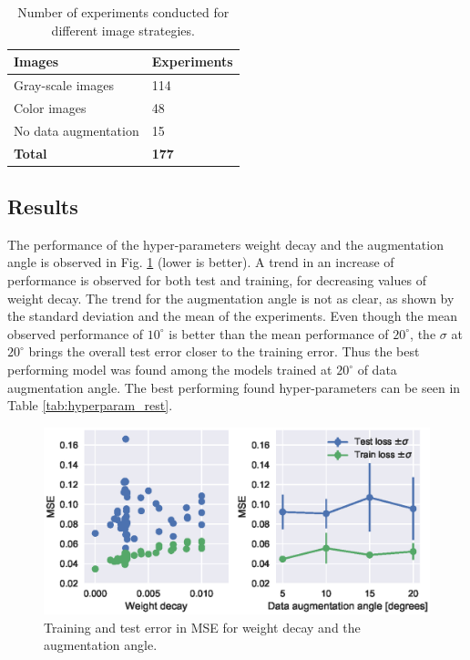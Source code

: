 \begin{table}[]
\centering
\begin{tabular}{@{}ll@{}}
\toprule
\textbf{Images} & \textbf{Experiments} \\ \midrule
Gray-scale images            & 114                  \\
Color images                 & 48                   \\
No data augmentation         & 15                   \\ \midrule
\textbf{Total}               & \textbf{177}         \\ \bottomrule
\end{tabular}
\caption{Number of experiments conducted for different image strategies.}\label{tab:experiments}
\end{table}


\subsection{Results}

The performance of the hyper-parameters weight decay and the augmentation angle is observed in Fig. \ref{fig:hyperparameters_weight_decay} (lower is better). A trend in an increase of performance is observed for both test and training, for decreasing values of weight decay. The trend for the augmentation angle is not as clear, as shown by the standard deviation and the mean of the experiments. Even though the mean observed performance of $10^{\circ}$ is better than the mean performance of $20^{\circ}$, the $\sigma$ at $20^{\circ}$ brings the overall test error closer to the training error. Thus the best performing model was found among the models trained at $20^{\circ}$ of data augmentation angle. The best performing found hyper-parameters can be seen in Table \ref{tab:hyperparam_rest}.

\begin{figure}
    \centering
    \includegraphics{chapters/part_pathloss/model_aided_paper/hyperparameters_grayscale.eps}
    \caption{Training and test error in MSE for weight decay and the augmentation angle.}
    \label{fig:hyperparameters_weight_decay}
\end{figure}


